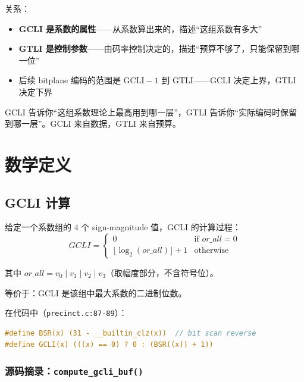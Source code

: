 关系：
\begin{itemize}
  \item \textbf{GCLI 是系数的属性}——从系数算出来的，描述``这组系数有多大''
  \item \textbf{GTLI 是控制参数}——由码率控制决定的，描述``预算不够了，只能保留到哪一位''
  \item 后续 bitplane 编码的范围是 $\mathrm{GCLI}-1$ 到 $\mathrm{GTLI}$——GCLI 决定上界，GTLI 决定下界
\end{itemize}

\begin{tcolorbox}[colback=yellow!5,colframe=yellow!60!black,title=关键区分]
GCLI 告诉你``这组系数理论上最高用到哪一层''，GTLI 告诉你``实际编码时保留到哪一层''。GCLI 来自数据，GTLI 来自预算。
\end{tcolorbox}

\section{数学定义}

\subsection{GCLI 计算}

给定一个系数组的 4 个 sign-magnitude 值，GCLI 的计算过程：
\begin{equation}
\mathit{GCLI} = \begin{cases} 0 & \text{if } \mathit{or\_all} = 0 \\ \lfloor \log_2(\mathit{or\_all}) \rfloor + 1 & \text{otherwise} \end{cases}
\end{equation}

其中 $\mathit{or\_all} = v_0 \mid v_1 \mid v_2 \mid v_3$（取幅度部分，不含符号位）。

等价于：GCLI 是该组中最大系数的二进制位数。

在代码中（\texttt{precinct.c:87-89}）：
\begin{lstlisting}[language=C,numbers=none]
#define BSR(x) (31 - __builtin_clz(x))  // bit scan reverse
#define GCLI(x) (((x) == 0) ? 0 : (BSR((x)) + 1))
\end{lstlisting}

\subsubsection{源码摘录：\texttt{compute\_gcli\_buf()}}

